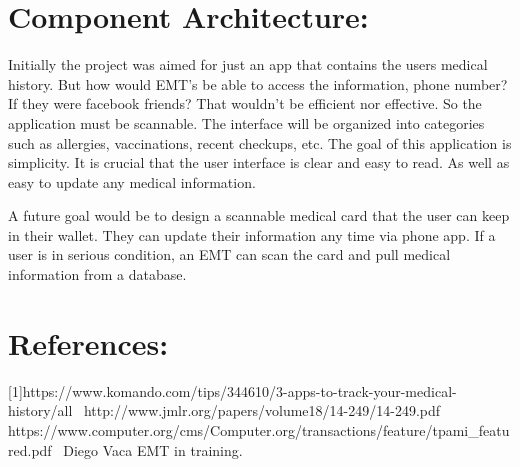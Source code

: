 \documentclass[12pt]{article}
\begin{document}
\section{Component Architecture:}

Initially the project was aimed for just an app that contains the users medical history. But how would EMT's be able to access the information, phone number? If they were facebook friends? That wouldn't be efficient nor effective. So the application must be scannable. \newline
\newline
The interface will be organized into categories such as allergies, vaccinations, recent checkups, etc. The goal of this application is simplicity. It is crucial that the user interface is clear and easy to read. As well as easy to update any medical information. 
\newline

A future goal would be to design a scannable medical card that the user can keep in their wallet. They can update their information any time via phone app. If a user is in serious condition, an EMT can scan the card and pull medical information from a database.

\section{References: }
[1]https://www.komando.com/tips/344610/3-apps-to-track-your-medical-history/all~\cite{web1}
\newline
[2] http://www.jmlr.org/papers/volume18/14-249/14-249.pdf ~\cite{web2}
 \newline
[3] https://www.computer.org/cms/Computer.org/transactions/feature/tpami_featured.pdf~\cite{web3}
 \newline
[4] Diego Vaca EMT in training.~\cite{person}
\end{document}
